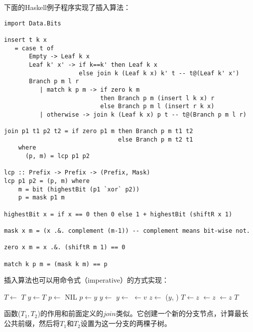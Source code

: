 \documentclass[UTF8]{article}
\begin{document}
下面的Haskell例子程序实现了插入算法：

\lstset{language=Haskell}
\begin{lstlisting}
import Data.Bits

insert t k x
   = case t of
       Empty -> Leaf k x
       Leaf k' x' -> if k==k' then Leaf k x
                     else join k (Leaf k x) k' t -- t@(Leaf k' x')
       Branch p m l r
          | match k p m -> if zero k m
                           then Branch p m (insert l k x) r
                           else Branch p m l (insert r k x)
          | otherwise -> join k (Leaf k x) p t -- t@(Branch p m l r)

join p1 t1 p2 t2 = if zero p1 m then Branch p m t1 t2
                                else Branch p m t2 t1
    where
      (p, m) = lcp p1 p2

lcp :: Prefix -> Prefix -> (Prefix, Mask)
lcp p1 p2 = (p, m) where
    m = bit (highestBit (p1 `xor` p2))
    p = mask p1 m

highestBit x = if x == 0 then 0 else 1 + highestBit (shiftR x 1)

mask x m = (x .&. complement (m-1)) -- complement means bit-wise not.

zero x m = x .&. (shiftR m 1) == 0

match k p m = (mask k m) == p
\end{lstlisting}

插入算法也可以用命令式（imperative）的方式实现：

\begin{algorithmic}[1]
    \State $T \gets$ 
    \State \Return $T$
  \EndIf
  \State $y \gets T$
  \State $p \gets$ NIL
    \State $p \gets y$
      \State $y \gets$ 
    \Else
      \State $y \gets$ 
    \EndIf
  \EndWhile
    \State {} $\gets v$
  \Else
    \State $z \gets$ ($y$, )
      \State $T \gets z$
    \Else
        \State {} $\gets z$
      \Else
        \State {} $\gets z$
      \EndIf
    \EndIf
  \EndIf
  \State \Return $T$
\EndFunction
\end{algorithmic}

函数($T_1, T_2$)的作用和前面定义的$join$类似。它创建一个新的分支节点，计算最长公共前缀，然后将$T_1$和$T_2$设置为这一分支的两棵子树。
\end{document}
